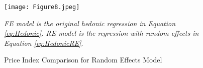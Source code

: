 \documentclass[12pt]{article}
\begin{document}
			\begin{figure}[!htb] %
			\begin{center}
				\caption{Price Index Comparison for Random Effects Model}
				\label{fig:AirbnbPriceRE}
				\texttt{[image: Figure8.jpeg]}
			\end{center}
			\vspace{-.2in}
			\emph{FE model is the original hedonic regression in Equation \ref{eq:Hedonic}. RE model is the regression with random effects in Equation \ref{eq:HedonicRE}}.
		\end{figure}

	\clearpage %




	\clearpage
	
	
	\nocite{*}
	\clearpage
\end{document}
